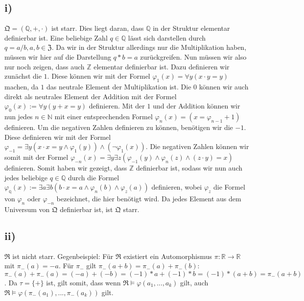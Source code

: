 \documentclass[11pt, a4paper]{article}
\begin{document}
\subsection*{i)}
$\mathfrak{Q} = (\mathbb{Q}, + , \cdot)$ ist starr. Dies liegt daran, dass $\mathbb{Q}$ in der Struktur elementar definierbar ist. Eine beliebige Zahl $q\in \mathbb{Q}$ lässt sich darstellen durch $q = a/b, a,b\in \mathfrak{Z}$. Da wir in der Struktur allerdings nur die Multiplikation haben, müssen wir hier auf die Darstellung $q * b =  a$ zurückgreifen. Nun müssen wir also nur noch zeigen, dass auch $\mathbb{Z}$ elementar definierbar ist. Dazu definieren wir zunächst die $1$. Diese können wir mit der Formel $\varphi_1(x) = \forall y (x \cdot y = y)$ machen, da $1$ das neutrale Element der Multiplikation ist. Die $0$ können wir auch direkt als neutrales Element der Addition mit der Formel $\varphi_0 (x) := \forall y (y+x = y)$ definieren.\newline
Mit der $1$ und der Addition können wir nun jedes $n\in \mathbb{N}$ mit einer entsprechenden Formel $\varphi_n(x) = (x = \varphi_{n-1} + 1)$ definieren. Um die negativen Zahlen definieren zu können, benötigen wir die $-1$. Diese definieren wir mit der Formel $\varphi_{-1} = \exists y (x \cdot x = y \land \varphi_1(y))\land (\neg \varphi_1(x))$. Die negativen Zahlen können wir somit mit der Formel $\varphi_{-n}(x) = \exists y \exists z (\varphi_{-1}(y) \land \varphi_n(z) \land (z \cdot y) = x)$ definieren.\newline
Somit haben wir gezeigt, dass $\mathbb{Z}$ definierbar ist, sodass wir nun auch jedes beliebige $q \in \mathbb{Q}$ durch die Formel $\varphi_\mathbb{q}(x) := \exists a \exists b (b \cdot x = a \land \varphi_n(b) \land \varphi_z(a))$ definieren, wobei $\varphi_z$ die Formel von $\varphi_n$ oder $\varphi_{-n}$ bezeichnet, die hier benötigt wird. Da jedes Element aus dem Universum von $\mathfrak{Q}$ definierbar ist, ist $\mathfrak{Q}$ starr.

\subsection*{ii)}
$\mathfrak{R}$ ist nicht starr. Gegenbeispiel: Für $\mathfrak{R}$ existiert ein Automorphismus $\pi: \mathbb{R} \to \mathbb{R}$ mit $\pi_-(a) = -a$. Für $\pi_-$ gilt $\pi_-(a+b) = \pi_-(a) + \pi_- (b)$:\newline
$\pi_-(a) + \pi_-(a) = (-a) + (-b) = (-1)*a + (-1)*b = (-1)*(a + b) = \pi_-(a + b)$. Da $\tau = \{+\}$ ist, gilt somit, dass wenn $\mathfrak{R} \vDash \varphi(a_1, ..., a_k)$ gilt, auch $\mathfrak{R} \vDash \varphi(\pi_-(a_1), ..., \pi_-(a_k))$ gilt.
\end{document}
